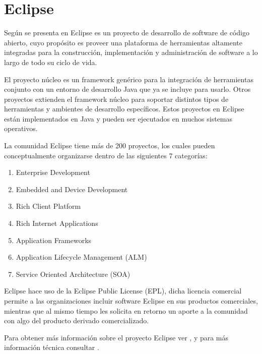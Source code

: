 \documentclass[a4paper,12pt,oneside]{book}
\begin{document}
\section{Eclipse}

Según se presenta en \cite{EMFADG, Eclipse} Eclipse es un proyecto de desarrollo de software de código abierto, cuyo propósito es proveer una plataforma de herramientas altamente integradas para la construcción, implementación y administración de software a lo largo de todo su ciclo de vida. 

El proyecto núcleo es un framework genérico para la integración de herramientas conjunto con un entorno de desarrollo Java que ya se incluye para usarlo. Otros proyectos extienden el framework núcleo para soportar distintos tipos de herramientas y ambientes de desarrollo específicos. Estos proyectos en Eclipse están implementados en Java y pueden ser ejecutados en muchos sistemas operativos.

La comunidad Eclipse tiene más de 200 proyectos, los cuales pueden conceptualmente organizarse dentro de las siguientes 7 categorías:

\begin{enumerate}

\item Enterprise Development

\item    Embedded and Device Development

\item    Rich Client Platform

\item    Rich Internet Applications

\item    Application Frameworks

\item    Application Lifecycle Management (ALM)

\item    Service Oriented Architecture (SOA)

\end{enumerate}

Eclipse hace uso de la Eclipse Public License (EPL), dicha licencia comercial permite a las organizaciones incluir software Eclipse en sus productos comerciales, mientras que al mismo tiempo les solicita en retorno un aporte a la comunidad con algo del producto derivado comercializado.

Para obtener más información sobre el proyecto Eclipse ver \cite[\url{www.eclipse.org}]{Eclipse}, y para más información técnica consultar \cite[Eclipse Platform Technical Overview]{EclipseTech}.
\end{document}
